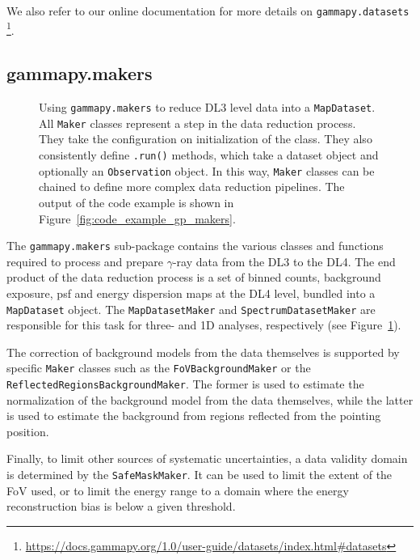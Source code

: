 \documentclass[longauth]{aa}
\newcommand{\code}[1]{\texttt{#1}}
\newcommand{\gammaray}{$\gamma$-ray\xspace}
\begin{document}
We also refer to our online documentation for more details on \code{gammapy.datasets}
\footnote{\url{https://docs.gammapy.org/1.0/user-guide/datasets/index.html\#datasets}}.

\subsection{gammapy.makers}
\label{ssec:gammapy-makers}
%
\begin{figure}
        \small
        \caption{
        Using \code{gammapy.makers} to reduce DL3 level data into a
                \code{MapDataset}. All \code{Maker} classes represent 
                a step in the data reduction process. They take
        the configuration on initialization of the class. They 
                also consistently define \code{.run()} methods, which take
                a dataset object and optionally an \code{Observation} 
                object. In this way, \code{Maker} classes can be chained
                to define more complex data reduction pipelines. The output
                of the code example is shown in Figure~\ref{fig:code_example_gp_makers}.
    }
        \label{fig*:minted:gp_makers}
\end{figure}
%
The \code{gammapy.makers} sub-package contains the various classes and functions required
to process and prepare \gammaray data from the DL3 to the DL4.
The end product of the data reduction process is a set of binned counts,
background exposure, psf and energy dispersion maps at the DL4 level, bundled
into a \code{MapDataset} object.
The \code{MapDatasetMaker} and \code{SpectrumDatasetMaker} are
responsible for this task for three- and 1D analyses, respectively (see Figure~\ref{fig*:minted:gp_makers}).

The correction of background models from the data themselves is supported 
by specific \code{Maker} classes such as the \code{FoVBackgroundMaker} or the
\code{ReflectedRegionsBackgroundMaker}. The former is used to estimate the
normalization of the background model from the data themselves, while the
latter is used to estimate the background from regions reflected from the
pointing position.

Finally, to limit other sources of systematic uncertainties, a data validity
domain is determined by the \code{SafeMaskMaker}. It can be used to limit the
extent of the FoV used, or to limit the energy range to a domain
where the energy reconstruction bias is below a given threshold.
\end{document}
